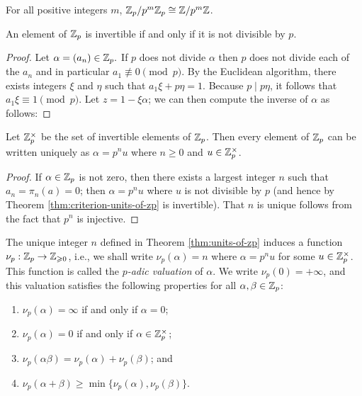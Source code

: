 \begin{corollary}
    For all positive integers \(m\), \(\mathbb{Z}_p / p^m \mathbb{Z}_p \cong
    \mathbb{Z} / p^m \mathbb{Z}\).
\end{corollary}

\begin{theoremx}\label{thm:criterion-units-of-zp} An element of \(\mathbb{Z}_p\)
    is invertible if and only if it is not divisible by \(p\).
\end{theoremx}

\begin{proof}
    Let \(\alpha = (a_n) \in \mathbb{Z}_p.\) If \(p\) does not divide \(\alpha\)
    then \(p\) does not divide each of the \(a_n\) and in particular \(a_1
    \not\equiv 0 \pmod{p}\). By the Euclidean algorithm, there exists integers
    \(\xi\) and \(\eta\) such that \(a_1\xi + p\eta = 1\). Because \(p \mid
    p\eta\), it follows that \(a_1\xi \equiv 1 \pmod{p}\). Let \(z = 1 -
    \xi\alpha\); we can then compute the inverse of \(\alpha\) as follows:
\end{proof}

\begin{theoremx}\label{thm:units-of-zp} Let \(\mathbb{Z}_p^{\times}\) be the set of invertible
    elements of \(\mathbb{Z}_p\). Then every element of \(\mathbb{Z}_p\) can be
    written uniquely as \(\alpha = p^nu\) where \(n \geq 0\) and \(u \in
    \mathbb{Z}_p^{\times}\).
\end{theoremx}

\begin{proof}
    If \(\alpha \in \mathbb{Z}_p\) is not zero, then there exists a largest
    integer \(n\) such that \(a_n = \pi_n(a) = 0\); then \(\alpha = p^nu\) where
    \(u\) is not divisible by \(p\) (and hence by Theorem
    \ref{thm:criterion-units-of-zp} is invertible). That \(n\) is unique follows
    from the fact that \(p^n\) is injective.
\end{proof}

\smallskip

The unique integer \(n\) defined in Theorem \ref{thm:units-of-zp} induces a
function \(\nu_p : \mathbb{Z}_p \to \mathbb{Z}_{\geqslant 0}\), i.e., we shall write
\(\nu_p(\alpha) = n\) where \(\alpha = p^nu\) for some \(u \in \mathbb{Z}_p^{\times}\). This
function is called the \emph{\(p\)-adic valuation} of \(\alpha\). We write
\(\nu_p(0) = +\infty\), and this valuation satisfies the following properties
for all \(\alpha, \beta \in \mathbb{Z}_p\):

\smallskip

\begin{enumerate}[nosep, label=(\roman*)]
    \item \(\nu_p(\alpha) =\infty\) if and only if \(\alpha =
    0\);\label{item:padic-valuation-zero}
    \item \(\nu_p(\alpha) = 0\) if and only if \(\alpha \in
    \mathbb{Z}_p^{\times}\);\label{item:padic-valuation-units}
    \item \(\nu_p(\alpha\beta) = \nu_p(\alpha) + \nu_p(\beta)\);
    and\label{item:padic-valuation-product}
    \item \(\nu_p(\alpha + \beta) \geq \min\{\nu_p(\alpha), \nu_p(\beta)\}\).
    \label{item:padic-valuation-sum}
\end{enumerate}

